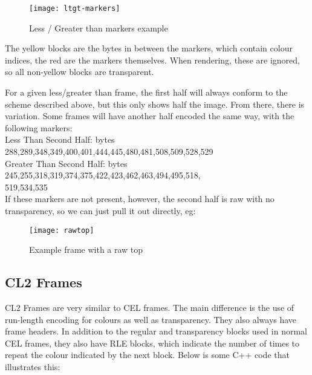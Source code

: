 \begin{itemize}
	\begin{figure}[H]
		\centering
		\texttt{[image: ltgt-markers]}
		\caption{Less / Greater than markers example}
	\end{figure}
	
The yellow blocks are the bytes in between the markers, which contain colour indices, the red are the markers themselves. When rendering, these are ignored, so all non-yellow blocks are transparent.

	For a given less/greater than frame, the first half will always conform to the scheme described above, but this only shows half the image.
	From there, there is variation. Some frames will have another half encoded the same way, with the following markers:\\
	Less Than Second Half: bytes 288,289,348,349,400,401,444,445,480,481,508,509,528,529\\
	Greater Than Second Half: bytes 245,255,318,319,374,375,422,423,462,463,494,495,518,\\
	519,534,535\\
	
	If these markers are not present, however, the second half is raw with no transparency, so we can just pull it out directly, eg:\\
	
	\begin{figure}[H]
		\centering
		\texttt{[image: rawtop]}
		\caption{Example frame with a raw top}
	\end{figure}
	
\end{itemize}

\newpage

\subsection{CL2 Frames}
	CL2 Frames are very similar to CEL frames. The main difference is the use of run-length encoding for colours as well as transparency. They also always have frame headers.
   In addition to the regular and transparency blocks used in normal CEL frames, they also have RLE blocks, which indicate the number of times to repeat the colour indicated by the next block.
   Below is some C++ code that illustrates this:
   
